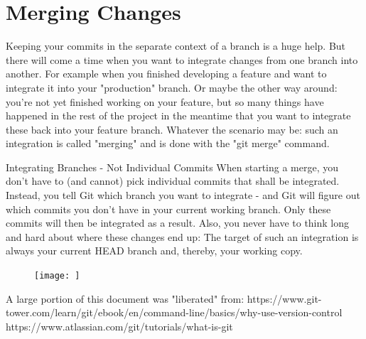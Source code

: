 \documentclass{article}
\begin{document}
\section{Merging Changes}
Keeping your commits in the separate context of a branch is a huge help. But there will come a time when you want to integrate changes from one branch into another. For example when you finished developing a feature and want to integrate it into your "production" branch. Or maybe the other way around: you're not yet finished working on your feature, but so many things have happened in the rest of the project in the meantime that you want to integrate these back into your feature branch.
\newline\newline
Whatever the scenario may be: such an integration is called "merging" and is done with the "git merge" command.
\begin{concept}
Integrating Branches - Not Individual Commits
\newline\newline
When starting a merge, you don't have to (and cannot) pick individual commits that shall be integrated. Instead, you tell Git which branch you want to integrate - and Git will figure out which commits you don't have in your current working branch. Only these commits will then be integrated as a result.
\newline\newline
Also, you never have to think long and hard about where these changes end up: The target of such an integration is always your current HEAD branch and, thereby, your working copy.
\begin{figure}[h]
    \centering
    \texttt{[image: ]}
\end{figure}
\end{concept}


\begin{thebibliography}{9}
A large portion of this document was "liberated" from:
https://www.git-tower.com/learn/git/ebook/en/command-line/basics/why-use-version-control
https://www.atlassian.com/git/tutorials/what-is-git
\end{thebibliography}
\end{document}
